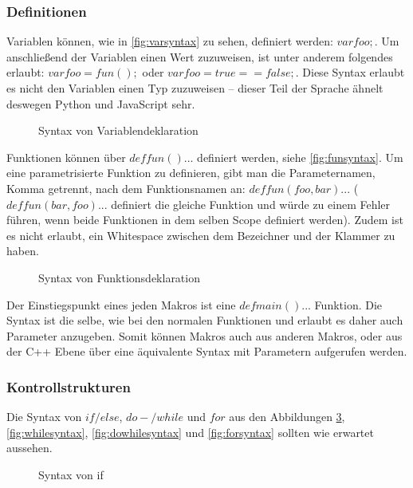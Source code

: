 {    %
    \subsubsection{Definitionen}
    \label{sssec:Definitionen}
      Variablen können, wie in \autoref{fig:varsyntax} zu sehen, definiert werden: \myMIn$var foo;$. Um anschließend der Variablen einen Wert zuzuweisen, ist unter anderem folgendes erlaubt: \myMIn$var foo = fun();$ oder \myMIn$var foo = true == false;$. Diese Syntax erlaubt es nicht den Variablen einen Typ zuzuweisen -- dieser Teil der Sprache ähnelt deswegen Python und JavaScript sehr.
      \begin{figure}[H]
        \centering
        \caption{Syntax von Variablendeklaration}
        \label{fig:varsyntax}
      \end{figure}

      Funktionen können über \myMIn$def fun(){...}$ definiert werden, siehe \autoref{fig:funsyntax}. Um eine parametrisierte Funktion zu definieren, gibt man die Parameternamen, Komma getrennt, nach dem Funktionsnamen an: \myMIn$def fun(foo, bar){...}$ (\myMIn$def fun(bar, foo){...}$ definiert die gleiche Funktion und würde zu einem Fehler führen, wenn beide Funktionen in dem selben Scope definiert werden). Zudem ist es nicht erlaubt, ein Whitespace zwischen dem Bezeichner und der Klammer zu haben.
      \begin{figure}[H]
        \centering
        \caption{Syntax von Funktionsdeklaration}
        \label{fig:funsyntax}
      \end{figure}
      Der Einstiegspunkt eines jeden Makros ist eine \myMIn$def main(){...}$ Funktion. Die Syntax ist die selbe, wie bei den normalen Funktionen und erlaubt es daher auch Parameter anzugeben. Somit können Makros auch aus anderen Makros, oder aus der C++ Ebene über eine äquivalente Syntax mit Parametern aufgerufen werden.

    \subsubsection{Kontrollstrukturen}
    \label{sssec:Kontrollstrukturen}
      Die Syntax von \myMIn$if/else$, \myMIn$do-/while$ und \myMIn$for$ aus den Abbildungen \ref{fig:ifsyntax}, \ref{fig:whilesyntax}, \ref{fig:dowhilesyntax} und \ref{fig:forsyntax} sollten wie erwartet aussehen.
      \begin{figure}[H]
        \centering
        \caption{Syntax von if}
        \label{fig:ifsyntax}
      \end{figure}

}
